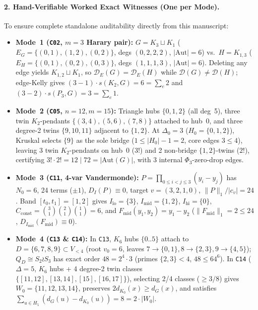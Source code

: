 \documentclass[10pt,twocolumn]{article}
\begin{document}
\paragraph{2. Hand-Verifiable Worked Exact Witnesses (One per Mode).}
To ensure complete standalone auditability directly from this manuscript:
\begin{itemize}[leftmargin=1.2em,itemsep=1pt,topsep=2pt]
  \item \textbf{Mode~1 (\texttt{C02}, $m{=}3$ Harary pair):} $G = K_3\sqcup K_1$ ($E_G=\{(0,1),(1,2),(0,2)\}$, degs $(0,2,2,2)$, $|\mathrm{Aut}|=6$) vs.\ $H = K_{1,3}$ ($E_H=\{(0,1),(0,2),(0,3)\}$, degs $(1,1,1,3)$, $|\mathrm{Aut}|=6$). Deleting any edge yields $K_{1,2}\sqcup K_1$, so $\mathcal{D}_E(G)=\mathcal{D}_E(H)$ while $\mathcal{D}(G)\ne\mathcal{D}(H)$; edge-Kelly gives $(3-1)\cdot s(K_2,G)=6=\sum_e 2$ and $(3-2)\cdot s(P_3,G)=3=\sum_e 1$.
  \item \textbf{Mode~2 (\texttt{C05}, $n{=}12, m{=}15$):} Triangle hubs $\{0,1,2\}$ (all deg~5), three twin $K_2$-pendants $\{(3,4),(5,6),(7,8)\}$ attached to hub~0, and three degree-2 twins $\{9,10,11\}$ adjacent to $\{1,2\}$. At $\Delta_0=3$ ($H_0=\{0,1,2\}$), Kruskal selects $\{9\}$ as the sole bridge ($1\le |H_0|-1=2$, core edges $3\le 4$), leaving 3 twin $K_2$-pendants on hub~0 ($3!$) and 2 non-bridge $\{1,2\}$-twins ($2!$), certifying $3!\cdot 2!=12 \mid 72 = |\mathrm{Aut}(G)|$, with 3 internal $\Phi_3$-zero-drop edges.
  \item \textbf{Mode~3 (\texttt{C11}, 4-var Vandermonde):} $P=\prod_{0\le i<j\le 3}(y_i-y_j)$ has $N_0=6$, 24 terms ($\pm 1$), $D_I(P)\equiv 0$, target $v=(3,2,1,0)$, $\|P\|_1/|c_v|=24$. Band $[t_0,t_1]=[1,2]$ gives $I_{\mathrm{lo}}=\{3\}$, $I_{\mathrm{mid}}=\{1,2\}$, $I_{\mathrm{hi}}=\{0\}$, $C_{\mathrm{const}}=\binom{3}{1}\binom{2}{1}\binom{1}{1}=6$, and $F_{\mathrm{mid}}(y_1,y_2)=y_1-y_2$ ($\|F_{\mathrm{mid}}\|_1=2\le 24$, $D_{I_{\mathrm{mid}}}(F_{\mathrm{mid}})\equiv 0$).
  \item \textbf{Mode~4 (\texttt{C13} \& \texttt{C14}):} In \texttt{C13}, $K_6$ hubs $\{0..5\}$ attach to $D=\{6,7,8,9\}\subset V_{<4}$ (root $v_0=6$, leaves $7\to\{0,1\}, 8\to\{2,3\}, 9\to\{4,5\}$); $Q_D\cong S_2\wr S_3$ has exact order $48=2^4\cdot 3$ (primes $\{2,3\}<4$, $48\le 64^6$). In \texttt{C14} ($\Delta=5$, $K_6$ hubs + 4 degree-2 twin classes $\{[11,12],[13,14],[15],[16,17]\}$), selecting 2/4 classes ($\ge 3/8$) gives $W_0=\{11,12,13,14\}$, preserves $2d_{K_0}(x)\ge d_G(x)$, and satisfies $\sum_{u\in H_5}(d_G(u)-d_{K_0}(u))=8=2\cdot|W_0|$.
\end{itemize}
\end{document}
